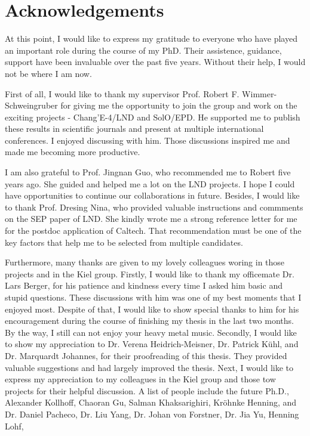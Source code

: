 \chapter*{Acknowledgements}

At this point, I would like to express my gratitude to everyone who have played an important role during the course of my PhD. Their assistence, guidance, support have been invaluable over the past five years. Without their help, I would not be where I am now.

First of all, I would like to thank my supervisor Prof. Robert F. Wimmer-Schweingruber for giving me the opportunity to join the group and work on the exciting projects - Chang'E-4/LND and SolO/EPD. He supported me to publish these results in scientific journals and present at multiple international conferences. I enjoyed discussing with him. Those discussions inspired me and made me becoming more productive.

I am also grateful to Prof. Jingnan Guo, who recommended me to Robert five years ago. She guided and helped me a lot on the LND projects. I hope I could have opportunities to continue our collaborations in future. Besides, I would like to thank Prof. Dresing Nina, who provided valuable instructions and commments on the SEP paper of LND. She kindly wrote me a strong reference letter for me for the postdoc application of Caltech. That recommendation must be one of the key factors that help me to be selected from multiple candidates.

Furthermore, many thanks are given to my lovely colleagues woring in those projects and in the Kiel group.  Firstly, I would like to thank my officemate Dr. Lars Berger, for his patience and kindness every time I asked him basic and stupid questions. These discussions with him was one of my best moments that I enjoyed most. Despite of that, I would like to show special thanks to him for his encouragement during the course of finishing my thesis in the last two months. By the way, I still can not enjoy your heavy metal music. 
Secondly, I would like to show my appreciation to Dr. Verena Heidrich-Meisner, Dr. Patrick K\"{u}hl, and Dr. Marquardt Johannes, for their proofreading of this thesis. They provided valuable suggestions and had largely improved the thesis.
Next, I would like to express my appreciation to my colleagues in the Kiel group and those tow projects for their helpful discussion. A list of people include the future Ph.D., Alexander Kollhoff, Chaoran Gu, Salman Khaksarighiri, Kr\"{o}hnke Henning, and Dr. Daniel Pacheco, Dr. Liu Yang, Dr. Johan von Forstner, Dr. Jia Yu, Henning Lohf,

